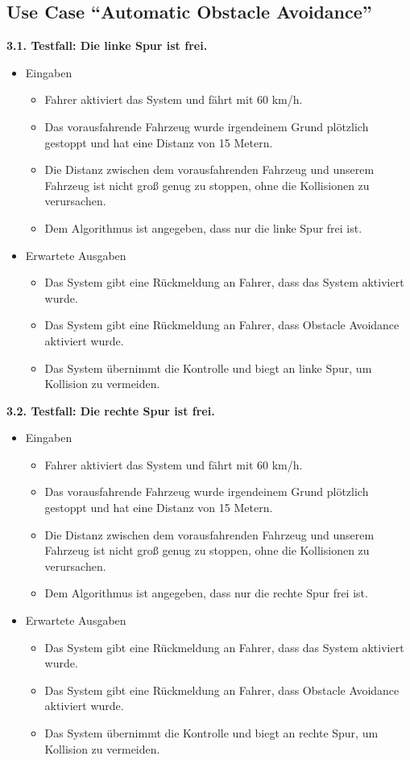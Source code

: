 \subsection{Use Case \enquote{Automatic Obstacle Avoidance}}
\textbf{3.1. Testfall: Die linke Spur ist frei.}
\begin{itemize}
	\item Eingaben
	\begin{itemize}
		\item Fahrer aktiviert das System und fährt mit 60 km/h.
		\item Das vorausfahrende Fahrzeug wurde irgendeinem Grund plötzlich gestoppt und hat eine Distanz von 15 Metern.
		\item Die Distanz zwischen dem vorausfahrenden Fahrzeug und unserem Fahrzeug ist nicht groß genug zu stoppen, ohne die Kollisionen zu verursachen.
		\item Dem Algorithmus ist angegeben, dass nur die linke Spur frei ist.
	\end{itemize}
	\item Erwartete Ausgaben
	\begin{itemize}
		\item Das System gibt eine Rückmeldung an Fahrer, dass das System aktiviert wurde.
		\item Das System gibt eine Rückmeldung an Fahrer, dass Obstacle Avoidance aktiviert wurde.
		\item Das System übernimmt die Kontrolle und biegt an linke Spur, um Kollision zu vermeiden.
	\end{itemize}
\end{itemize}
\textbf{3.2. Testfall: Die rechte Spur ist frei.}
\begin{itemize}
	\item Eingaben
	\begin{itemize}
		\item Fahrer aktiviert das System und fährt mit 60 km/h.
		\item Das vorausfahrende Fahrzeug wurde irgendeinem Grund plötzlich gestoppt und hat eine Distanz von 15 Metern.
		\item Die Distanz zwischen dem vorausfahrenden Fahrzeug und unserem Fahrzeug ist nicht groß genug zu stoppen, ohne die Kollisionen zu verursachen.
		\item Dem Algorithmus ist angegeben, dass nur die rechte Spur frei ist.
	\end{itemize}
	\item Erwartete Ausgaben
	\begin{itemize}
		\item Das System gibt eine Rückmeldung an Fahrer, dass das System aktiviert wurde.
		\item Das System gibt eine Rückmeldung an Fahrer, dass Obstacle Avoidance aktiviert wurde.
		\item Das System übernimmt die Kontrolle und biegt an rechte Spur, um Kollision zu vermeiden.
	\end{itemize}
\end{itemize}
